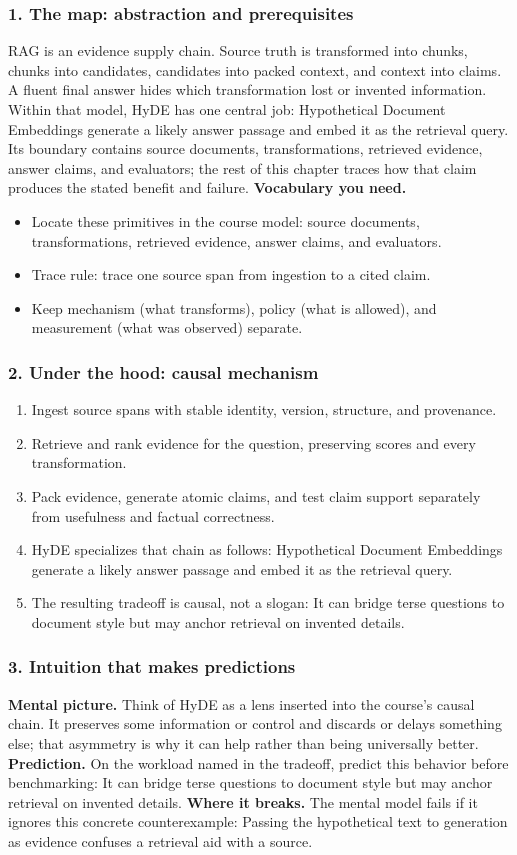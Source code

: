 \subsubsection*{1. The map: abstraction and prerequisites}
RAG is an evidence supply chain. Source truth is transformed into chunks, chunks into candidates, candidates into packed context, and context into claims. A fluent final answer hides which transformation lost or invented information.
Within that model, HyDE has one central job: Hypothetical Document Embeddings generate a likely answer passage and embed it as the retrieval query. Its boundary contains source documents, transformations, retrieved evidence, answer claims, and evaluators; the rest of this chapter traces how that claim produces the stated benefit and failure.
\textbf{Vocabulary you need.}\begin{itemize}
\item Locate these primitives in the course model: source documents, transformations, retrieved evidence, answer claims, and evaluators.
\item Trace rule: trace one source span from ingestion to a cited claim.
\item Keep mechanism (what transforms), policy (what is allowed), and measurement (what was observed) separate.
\end{itemize}
\subsubsection*{2. Under the hood: causal mechanism}\begin{enumerate}
\item Ingest source spans with stable identity, version, structure, and provenance.
\item Retrieve and rank evidence for the question, preserving scores and every transformation.
\item Pack evidence, generate atomic claims, and test claim support separately from usefulness and factual correctness.
\item HyDE specializes that chain as follows: Hypothetical Document Embeddings generate a likely answer passage and embed it as the retrieval query.
\item The resulting tradeoff is causal, not a slogan: It can bridge terse questions to document style but may anchor retrieval on invented details.
\end{enumerate}
\subsubsection*{3. Intuition that makes predictions}
\textbf{Mental picture.} Think of HyDE as a lens inserted into the course's causal chain. It preserves some information or control and discards or delays something else; that asymmetry is why it can help rather than being universally better.
\textbf{Prediction.} On the workload named in the tradeoff, predict this behavior before benchmarking: It can bridge terse questions to document style but may anchor retrieval on invented details.
\textbf{Where it breaks.} The mental model fails if it ignores this concrete counterexample: Passing the hypothetical text to generation as evidence confuses a retrieval aid with a source.
